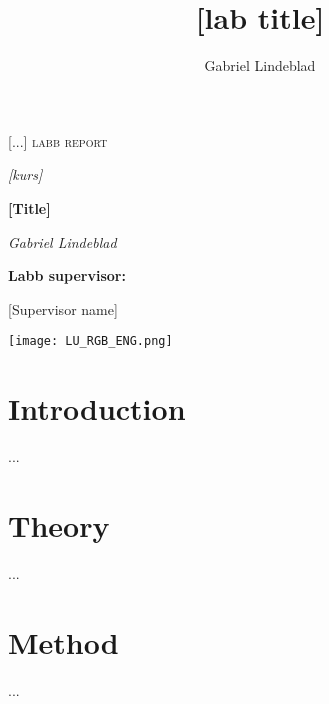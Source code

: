 \documentclass{article}
\title{[lab title]}
\author{Gabriel Lindeblad} %
\begin{document}
\begin{titlepage}

    \vspace*{2.5cm}
	\centering
	{\huge \textsc{[...] labb report} \par}
    \vspace{0.1cm}
    {\large\itshape [kurs] \par}
	\vspace{0.5cm}
	{\Huge\bfseries [Title]\par}
	\vspace{1cm}
	{\Large\itshape Gabriel Lindeblad \par} %
	\vfill

	\Large{\bfseries Labb supervisor:\par } [Supervisor name]

	\vfill

    \vspace{1.5cm}
    \texttt{[image: LU\_RGB\_ENG.png]} %
    \vspace*{0.5cm}

\end{titlepage}

\tableofcontents
\newpage


\section{Introduction}\label{sec:Introduction}
...


\section{Theory}\label{sec:Theory}
...


\section{Method}\label{sec:Method}
...
\end{document}
